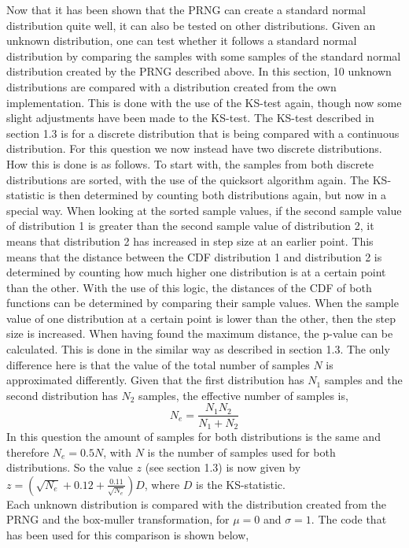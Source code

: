 Now that it has been shown that the PRNG can create a standard normal distribution quite well, it can also be tested on other distributions. Given an unknown distribution, one can test whether it follows a standard normal distribution by comparing the samples with some samples of the standard normal distribution created by the PRNG described above. In this section, 10 unknown distributions are compared with a distribution created from the own implementation. This is done with the use of the KS-test again, though now some slight adjustments have been made to the KS-test. The KS-test described in section 1.3 is for a discrete distribution that is being compared with a continuous distribution. For this question we now instead have two discrete distributions. How this is done is as follows. To start with, the samples from both discrete distributions are sorted, with the use of the quicksort algorithm again. The KS-statistic is then determined by counting both distributions again, but now in a special way. When looking at the sorted sample values, if the second sample value of distribution 1 is greater than the second sample value of distribution 2, it means that distribution 2 has increased in step size at an earlier point. This means that the distance between the CDF distribution 1 and distribution 2 is determined by counting how much higher one distribution is at a certain point than the other. With the use of this logic, the distances of the CDF of both functions can be determined by comparing their sample values. When the sample value of one distribution at a certain point is lower than the other, then the step size is increased. When having found the maximum distance, the p-value can be calculated. This is done in the similar way as described in section 1.3. The only difference here is that the value of the total number of samples $N$ is approximated differently. Given that the first distribution has $N_1$ samples and the second distribution has $N_2$ samples, the effective number of samples is,
\begin{equation*}
N_e  = \frac{N_1 N_2}{N_1 + N_2}
\end{equation*}
In this question the amount of samples for both distributions is the same and therefore $N_e = 0.5N$, with $N$ is the number of samples used for both distributions. So the value $z$ (see section 1.3) is now given by $z = \left(\sqrt{N_e} + 0.12 + \frac{0.11}{\sqrt{N_e}}\right)D$, where $D$ is the KS-statistic.\\
Each unknown distribution is compared with the distribution created from the PRNG and the box-muller transformation, for $\mu =0$ and $\sigma = 1$. The code that has been used for this comparison is shown below,
